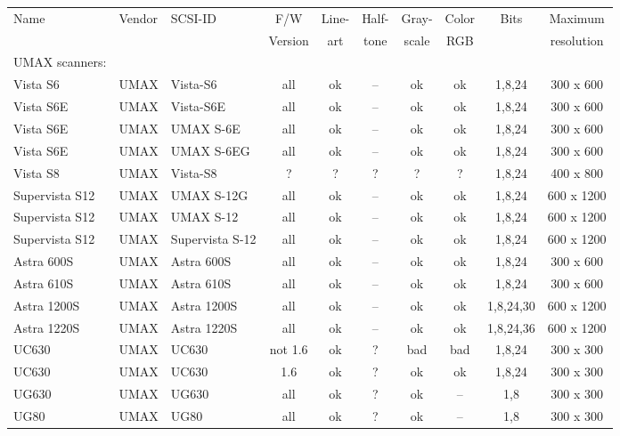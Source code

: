 \small
\begin{tabular}{|l|l|l|c|c|c|c|c|c|c|}
\hline
Name&Vendor&SCSI-ID&F/W&Line-&Half-&Gray-&Color&Bits&Maximum\\
&&&Version&art&tone&scale&RGB&&resolution\\
\hline
\hline
UMAX scanners:&&&&&&&&&\\
Vista S6           &UMAX     &Vista-S6        &all     &ok  &--  &ok  &ok    &1,8,24    &  300 x  600\\
Vista S6E          &UMAX     &Vista-S6E       &all     &ok  &--  &ok  &ok    &1,8,24    &  300 x  600\\
Vista S6E          &UMAX     &UMAX S-6E       &all     &ok  &--  &ok  &ok    &1,8,24    &  300 x  600\\
Vista S6E          &UMAX     &UMAX S-6EG      &all     &ok  &--  &ok  &ok    &1,8,24    &  300 x  600\\
Vista S8           &UMAX     &Vista-S8        &?       &?   &?   &?   &?     &1,8,24    &  400 x  800\\
Supervista S12     &UMAX     &UMAX S-12G      &all     &ok  &--  &ok  &ok    &1,8,24    &  600 x 1200\\
Supervista S12     &UMAX     &UMAX S-12       &all     &ok  &--  &ok  &ok    &1,8,24    &  600 x 1200\\
Supervista S12     &UMAX     &Supervista S-12 &all     &ok  &--  &ok  &ok    &1,8,24    &  600 x 1200\\
Astra 600S         &UMAX     &Astra 600S      &all     &ok  &--  &ok  &ok    &1,8,24    &  300 x  600\\
Astra 610S         &UMAX     &Astra 610S      &all     &ok  &--  &ok  &ok    &1,8,24    &  300 x  600\\
Astra 1200S        &UMAX     &Astra 1200S     &all     &ok  &--  &ok  &ok    &1,8,24,30 &  600 x 1200\\
Astra 1220S        &UMAX     &Astra 1220S     &all     &ok  &--  &ok  &ok    &1,8,24,36 &  600 x 1200\\
UC630              &UMAX     &UC630           &not 1.6 &ok  &?   &bad &bad   &1,8,24    &  300 x  300\\
UC630              &UMAX     &UC630           &1.6     &ok  &?   &ok  &ok    &1,8,24    &  300 x  300\\
UG630              &UMAX     &UG630           &all     &ok  &?   &ok  &--    &1,8       &  300 x  300\\
UG80               &UMAX     &UG80            &all     &ok  &?   &ok  &--    &1,8       &  300 x  300\\

\end{tabular}

